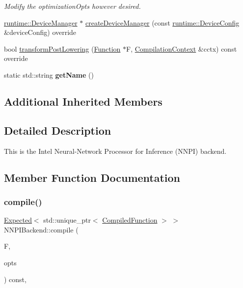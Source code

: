 \begin{DoxyCompactItemize}
\begin{DoxyCompactList}\small\item\em Modify the {\ttfamily optimization\+Opts} however desired. \end{DoxyCompactList}\item 
\hyperlink{classglow_1_1runtime_1_1_device_manager}{runtime\+::\+Device\+Manager} $\ast$ \hyperlink{classglow_1_1_n_n_p_i_backend_ad40f8e5a376846bcf4d2f615ffc373e7}{create\+Device\+Manager} (const \hyperlink{structglow_1_1runtime_1_1_device_config}{runtime\+::\+Device\+Config} \&device\+Config) override
\item 
bool \hyperlink{classglow_1_1_n_n_p_i_backend_ac467449ebb66b2a44d41da66180d7d91}{transform\+Post\+Lowering} (\hyperlink{classglow_1_1_function}{Function} $\ast$F, \hyperlink{structglow_1_1_compilation_context}{Compilation\+Context} \&cctx) const override
\item 
\mbox{\label{classglow_1_1_n_n_p_i_backend_a62c16924721b362523e3c0865f3395fc}} 
static std\+::string {\bfseries get\+Name} ()
\end{DoxyCompactItemize}
\subsection*{Additional Inherited Members}


\subsection{Detailed Description}
This is the Intel Neural-\/\+Network Processor for Inference (N\+N\+PI) backend. 

\subsection{Member Function Documentation}
\mbox{\label{classglow_1_1_n_n_p_i_backend_af773c63c90b4d6c89c75c0057e5a6157}} 
\subsubsection{\texorpdfstring{compile()}{compile()}}
{\footnotesize\ttfamily \hyperlink{classglow_1_1detail_1_1_glow_expected}{Expected}$<$ std\+::unique\+\_\+ptr$<$ \hyperlink{classglow_1_1_compiled_function}{Compiled\+Function} $>$ $>$ N\+N\+P\+I\+Backend\+::compile (\begin{DoxyParamCaption}\item[{\hyperlink{classglow_1_1_function}{Function} $\ast$}]{F,  }\item[{const \hyperlink{structglow_1_1_backend_options}{Backend\+Options} \&}]{opts }\end{DoxyParamCaption}) const\hspace{0.3cm}{\ttfamily [override]}, {\ttfamily [virtual]}}



